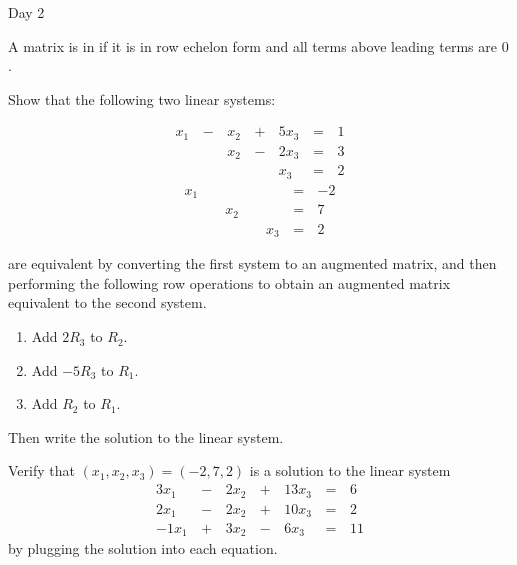 \begin{applicationActivities}{Day 2}
\begin{definition}
  A matrix is in  if it is in row echelon form
  and all terms above leading terms are \(0\).
\end{definition}

\begin{activity}{10}
  Show that the following two linear systems:
  \begin{multicols}{2}\noindent
    \begin{alignat*}{4}
       x_1 &\,-\,&  x_2  &\,+\,&  5x_3 &\,=\,& 1 \\
           &\, \,&  x_2 &\,-\,&  2x_3 &\,=\,& 3 \\
           &\, \,&      &\, \,&   x_3 &\,=\,& 2
    \end{alignat*}
      \begin{alignat*}{4}
         x_1 &\, \,&      &\, \,&       &\,=\,& -2 \\
             &\, \,&  x_2 &\, \,&       &\,=\,& 7 \\
             &\, \,&      &\, \,&   x_3 &\,=\,& 2
      \end{alignat*}
  \end{multicols}
  are equivalent by converting the first system to an augmented matrix,
  and then performing the following row operations to obtain
  an augmented matrix equivalent to the second system.
  \begin{enumerate}
    \item Add \(2R_3\) to \(R_2\).
    \item Add \(-5R_3\) to \(R_1\).
    \item Add \(R_2\) to \(R_1\).
  \end{enumerate}
  Then write the solution to the linear system.
\end{activity}

\begin{activity}{5}
  Verify that \((x_1,x_2,x_3)=(-2,7,2)\) is a solution to the linear system
    \begin{alignat*}{4}
      3x_1 &\,-\,& 2x_2 &\,+\,& 13x_3 &\,=\,& 6 \\
      2x_1 &\,-\,& 2x_2 &\,+\,& 10x_3 &\,=\,& 2 \\
     -1x_1 &\,+\,& 3x_2 &\,-\,&  6x_3 &\,=\,& 11
    \end{alignat*}
  by plugging the solution into each equation.
\end{activity}


\end{applicationActivities}
